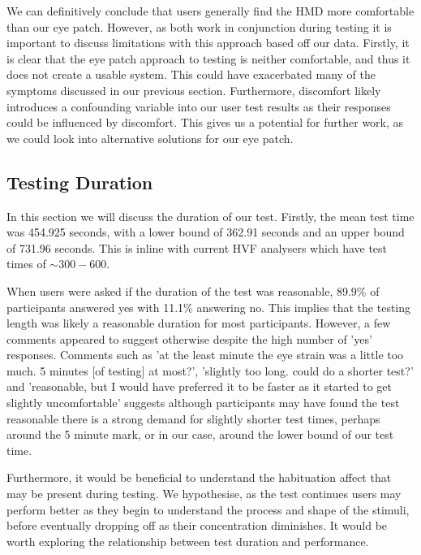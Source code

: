 \documentclass{l4proj}
\begin{document}
We can definitively conclude that users generally find the HMD more comfortable than our eye patch. However, as both work in conjunction during testing it is important to discuss limitations with this approach based off our data. Firstly, it is clear that the eye patch approach to testing is neither comfortable, and thus it does not create a usable system. This could have exacerbated many of the symptoms discussed in our previous section. Furthermore, discomfort likely introduces  a confounding variable into our user test results as their responses could be influenced by discomfort. This gives us a potential for further work, as we could look into alternative solutions for our eye patch.


\subsection{Testing Duration}
In this section we will discuss the duration of our test. Firstly, the mean test time was 454.925 seconds, with a lower bound of 362.91 seconds and an upper bound of 731.96 seconds. This is inline with current HVF analysers which have test times of \( \sim300-600 \). 

When users were asked if the duration of the test was reasonable, 89.9\% of participants answered yes with 11.1\% answering no. This implies that the testing length was likely a reasonable duration for most participants. However, a few comments appeared to suggest otherwise despite the high number of 'yes' responses. Comments such as 'at the least minute the eye strain was a little too much. 5 minutes [of testing] at most?', 'slightly too long. could do a shorter test?' and 'reasonable, but I would have preferred it to be faster as it started to get slightly uncomfortable' suggests although participants may have found the test reasonable there is a strong demand for slightly shorter test times, perhaps around the 5 minute mark, or in our case, around the lower bound of our test time.

Furthermore, it would be beneficial to understand the habituation affect that may be present during testing. We hypothesise, as the test continues users may perform better as they begin to understand the process and shape of the stimuli, before eventually dropping off as their concentration diminishes. It would be worth exploring the relationship between test duration and performance.
\end{document}
